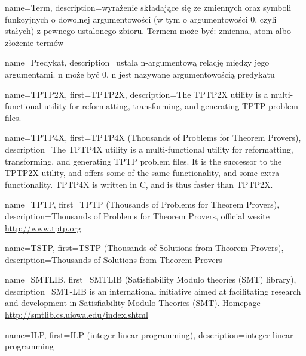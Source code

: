  {
    name=Term,
    description={wyrażenie składające się ze zmiennych oraz symboli funkcyjnych o dowolnej argumentowości (w tym o argumentowości 0, czyli stałych) z pewnego ustalonego zbioru. Termem może być: zmienna, atom albo złożenie termów}
}

 {
    name=Predykat,
    description={ustala n-argumentową relację między jego argumentami. n może być 0. n jest nazywane argumentowością predykatu}
}

 {
    name=TPTP2X,
    first={TPTP2X},
    description={The TPTP2X utility is a multi-functional utility for reformatting, transforming, and generating TPTP problem files.}
}

 {
    name=TPTP4X,
    first={TPTP4X (Thousands of Problems for Theorem Provers)},
    description={The TPTP4X utility is a multi-functional utility for reformatting, transforming, and generating TPTP problem files. It is the successor to the TPTP2X utility, and offers some of the same functionality, and some extra functionality. TPTP4X is written in C, and is thus faster than TPTP2X.}
}

 {
    name=TPTP,
    first={TPTP (Thousands of Problems for Theorem Provers)},
    description={Thousands of Problems for Theorem Provers, official wesite \url{http://www.tptp.org}}
}

 {
    name=TSTP,
    first={TSTP (Thousands of Solutions from Theorem Provers)},
    description={Thousands of Solutions from Theorem Provers}
}

 {
    name=SMTLIB,
    first={SMTLIB (Satisfiability Modulo theories (SMT) library)},
    description={SMT-LIB is an international initiative aimed at facilitating research and development in Satisfiability Modulo Theories (SMT). Homepage \url{http://smtlib.cs.uiowa.edu/index.shtml}}
}

 {
    name=ILP,
    first={ILP (integer linear programming)},
    description={integer linear programming}
}


%
%

